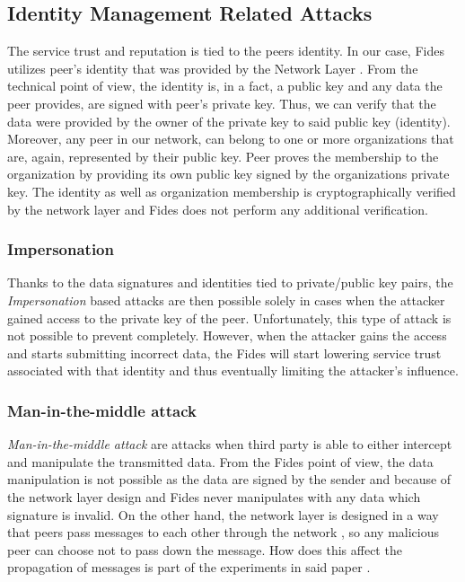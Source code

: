 \subsection{Identity Management Related Attacks}
\label{subsec:identity-management-attacks}
The service trust and reputation is tied to the peers identity. 
In our case, Fides utilizes peer's identity that was provided by the Network Layer \cite{nl}.
From the technical point of view, the identity is, in a fact, a public key and any data the peer provides, are signed with peer's private key. Thus, we can verify that the data were provided by the owner of the private key to said public key (identity).
Moreover, any peer in our network, can belong to one or more organizations that are, again, represented by their public key. 
Peer proves the membership to the organization by providing its own public key signed by the organizations private key.
The identity as well as organization membership is cryptographically verified by the network layer \cite{nl} and Fides does not perform any additional verification. 

\subsubsection{Impersonation}
Thanks to the data signatures and identities tied to private/public key pairs, the \textit{Impersonation} based attacks are then possible solely in cases when the attacker gained access to the private key of the peer.
Unfortunately, this type of attack is not possible to prevent completely. 
However, when the attacker gains the access and starts submitting incorrect data, the Fides will start lowering service trust associated with that identity and thus eventually limiting the attacker's influence.

\subsubsection{Man-in-the-middle attack}
\textit{Man-in-the-middle attack} are attacks when third party is able to either intercept and manipulate the transmitted data.
From the Fides point of view, the data manipulation is not possible as the data are signed by the sender and because of the network layer \cite{nl} design and Fides never manipulates with any data which signature is invalid.
On the other hand, the network layer is designed in a way that peers pass messages to each other through the network \cite{nl}, so any malicious peer can choose not to pass down the message.
How does this affect the propagation of messages is part of the experiments in said paper \cite{nl}.

